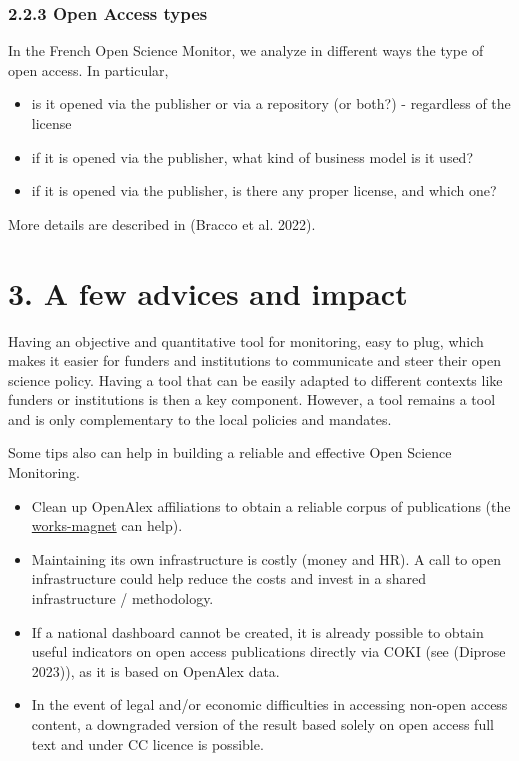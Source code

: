 \documentclass[
]{article}
\begin{document}
\hypertarget{open-access-types}{%
\subsubsection{2.2.3 Open Access types}\label{open-access-types}}

In the French Open Science Monitor, we analyze in different ways the
type of open access. In particular,

\begin{itemize}
\item
  is it opened via the publisher or via a repository (or both?) -
  regardless of the license
\item
  if it is opened via the publisher, what kind of business model is it
  used?
\item
  if it is opened via the publisher, is there any proper license, and
  which one?
\end{itemize}

More details are described in (Bracco et al. 2022).

\hypertarget{a-few-advices-and-impact}{%
\section{3. A few advices and impact}\label{a-few-advices-and-impact}}

Having an objective and quantitative tool for monitoring, easy to plug,
which makes it easier for funders and institutions to communicate and
steer their open science policy. Having a tool that can be easily
adapted to different contexts like funders or institutions is then a key
component. However, a tool remains a tool and is only complementary to
the local policies and mandates.

Some tips also can help in building a reliable and effective Open
Science Monitoring.

\begin{itemize}
\item
  Clean up OpenAlex affiliations to obtain a reliable corpus of
  publications (the
  \href{https://works-magnet.dataesr.ovh/}{works-magnet} can help).
\item
  Maintaining its own infrastructure is costly (money and HR). A call to
  open infrastructure could help reduce the costs and invest in a shared
  infrastructure / methodology.
\item
  If a national dashboard cannot be created, it is already possible to
  obtain useful indicators on open access publications directly via COKI
  (see (Diprose 2023)), as it is based on OpenAlex data.
\item
  In the event of legal and/or economic difficulties in accessing
  non-open access content, a downgraded version of the result based
  solely on open access full text and under CC licence is possible.
\end{itemize}
\end{document}
